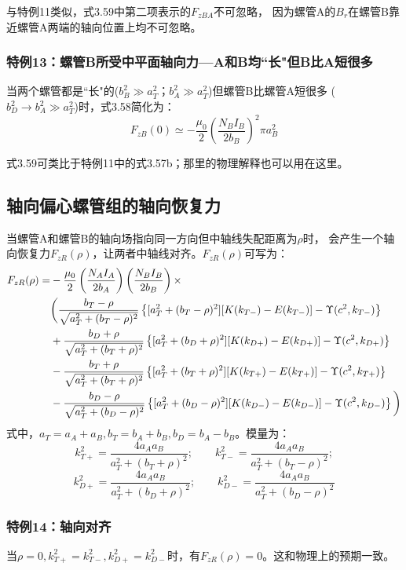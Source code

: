 与特例11类似，式3.59中第二项表示的$F_{zBA}$不可忽略，
因为螺管A的$B_r$在螺管B靠近螺管A两端的轴向位置上均不可忽略。

\subsubsection{特例13：螺管B所受中平面轴向力---A和B均``长"但B比A短很多}
当两个螺管都是``长"的($b_B^2\gg a_T^2；b_A^2\gg a_T^2$)但螺管B比螺管A短很多
($b_D^2\rightarrow b_A^2\gg a_T^2$)时，式3.58简化为：
\begin{equation*}
F_{zB}(0)\simeq-\frac{\mu_0}{2}\left(\frac{N_BI_B}{2b_B}\right)^2\pi a_B^2 \tag{3.59b}
\end{equation*}

式3.59可类比于特例11中的式3.57b；那里的物理解释也可以用在这里。


\subsection{轴向偏心螺管组的轴向恢复力}
当螺管A和螺管B的轴向场指向同一方向但中轴线失配距离为$\rho$时，
会产生一个轴向恢复力$F_{zR}(\rho)$，让两者中轴线对齐。$F_{zR}(\rho)$可写为：
\begin{align}
F_{zR}(\rho)=&-\frac{\mu_0}{2}\left(\frac{N_AI_A}{2b_A}\right)\left(\frac{N_BI_B}{2b_B}\right)\times\\\notag
&\bigg(\frac{b_T-\rho}{\sqrt{a_T^2+(b_T-\rho)^2}}\left\{[a_T^2+(b_T-\rho)^2][K(k_{T-})-E(k_{T-})]-\Upsilon(c^2,k_{T-})\right\}\\\notag
&+\frac{b_D+\rho}{\sqrt{a_T^2+(b_T+\rho)^2}}\left\{[a_T^2+(b_D+\rho)^2][K(k_{D+})-E(k_{D+})]-\Upsilon(c^2,k_{D+})\right\}\\\notag
&-\frac{b_T+\rho}{\sqrt{a_T^2+(b_T+\rho)^2}}\left\{[a_T^2+(b_T+\rho)^2][K(k_{T+})-E(k_{T+})]-\Upsilon(c^2,k_{T+})\right\}\\\notag
&-\frac{b_D-\rho}{\sqrt{a_T^2+(b_D-\rho)^2}}\left\{[a_T^2+(b_D-\rho)^2][K(k_{D-})-E(k_{D-})]-\Upsilon(c^2,k_{D-})\right\}\bigg)
\end{align}
式中，$a_T=a_A+a_B, b_T=b_A+b_B, b_D=b_A−b_B$。模量为：
$$
k_{T+}^2=\frac{4a_Aa_B}{a_T^2+(b_T+\rho)^2};\qquad k_{T-}^2=\frac{4a_Aa_B}{a_T^2+(b_T-\rho)^2};$$
$$k_{D+}^2=\frac{4a_Aa_B}{a_T^2+(b_D+\rho)^2}; \qquad k_{D-}^2=\frac{4a_Aa_B}{a_T^2+(b_D-\rho)^2}$$


\subsubsection{特例14：轴向对齐}
当$\rho=0, k_{T+}^2=k_{T-}^2, k_{D+}^2=k_{D-}^2$时，有$F_{zR}(\rho)=0$。这和物理上的预期一致。

